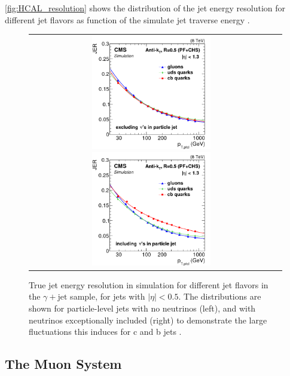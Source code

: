 \autoref{fig:HCAL_resolution} shows the distribution of the jet energy resolution for different jet flavors as function of the simulate jet traverse energy \cite{Khachatryan:2016kdb}.

\begin{figure}[tbh!]
	\centering
	\begin{tabular}{cc}
		\includegraphics[width=0.50\textwidth]{detector/pics/JER_8tev_nonu.png}
		\includegraphics[width=0.50\textwidth]{detector/pics/JER_8tev_nu.png}
	\end{tabular}
	\caption{True jet energy resolution in simulation for different jet flavors in the $\gamma + \text{jet}$ sample, for jets with $| \eta | < 0.5$. The distributions are shown for particle-level jets with no neutrinos (left), and with neutrinos exceptionally included (right) to demonstrate the large fluctuations this induces for c and b jets \cite{Khachatryan:2016kdb}.}
	\label{fig:HCAL_resolution}
\end{figure}

\clearpage

\subsection{The Muon System}

